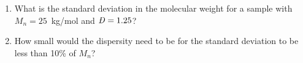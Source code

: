 \begin{activity}
\begin{exercises}
			\begin{enumerate}
				\item What is the standard deviation in the molecular weight for a sample with $M_n=25$~kg/mol and $\PDImath=1.25$?
				
				\item How small would the dispersity need to be for the standard deviation to be less than 10\% of $M_n$?
			\end{enumerate}
			
\end{exercises}
	
\end{activity}